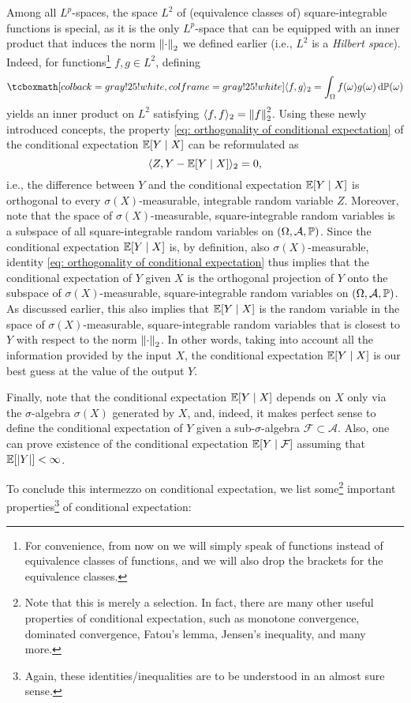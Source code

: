 Among all $L^p$-spaces, the space $L^2$ of (equivalence classes of) square-integrable functions is special, as it is the only $L^p$-space that can be equipped with an inner product that induces the norm $\norm{\cdot}_2$ we defined earlier (i.e., $L^2$ is a \emph{Hilbert space}). Indeed, for functions\footnote{For convenience, from now on we will simply speak of functions instead of equivalence classes of functions, and we will also drop the brackets for the equivalence classes.} $f, g \in L^2$, defining
\[
    \highlightMath{
        \langle f, g \rangle_2 = \int_{\Omega} f(\omega) g(\omega) \dP(\omega)
    }
\]
yields an inner product on $L^2$ satisfying $\langle f, f \rangle_2 = \norm{f}_2^2$. Using these newly introduced concepts, the property \eqref{eq: orthogonality of conditional expectation} of the conditional expectation $\Exp[Y \given X]$ can be reformulated as
\[
    \langle Z, Y - \Exp[Y \given X] \rangle_2 = 0,
\]
i.e., the difference between $Y$ and the conditional expectation $\Exp[Y \given X]$ is orthogonal to every $\sigma(X)$-measurable, integrable random variable $Z$. Moreover, note that the space of $\sigma(X)$-measurable, square-integrable random variables is a subspace of all square-integrable random variables on $(\Omega, \mathcal{A}, \P)$. Since the conditional expectation $\Exp[Y \given X]$ is, by definition, also $\sigma(X)$-measurable, identity \eqref{eq: orthogonality of conditional expectation} thus implies that the conditional expectation of $Y$ given $X$ is the orthogonal projection of $Y$ onto the subspace of $\sigma(X)$-measurable, square-integrable random variables on $(\Omega, \mathcal{A}, \P)$. As discussed earlier, this also implies that $\Exp[Y \given X]$ is the random variable in the space of $\sigma(X)$-measurable, square-integrable random variables that is closest to $Y$ with respect to the norm $\norm{\cdot}_2$. In other words, taking into account all the information provided by the input $X$, the conditional expectation $\Exp[Y \given X]$ is our best guess at the value of the output $Y$.

Finally, note that the conditional expectation $\Exp[Y \given X]$ depends on $X$ only via the $\sigma$-algebra $\sigma(X)$ generated by $X$, and, indeed, it makes perfect sense to define the conditional expectation of $Y$ given a sub-$\sigma$-algebra $\mathcal{F} \subset \mathcal{A}$. Also, one can prove existence of the conditional expectation $\Exp[Y \given \mathcal{F}]$ assuming that $\Exp[\abs{Y}] < \infty$.

To conclude this intermezzo on conditional expectation, we list some\footnote{Note that this is merely a selection. In fact, there are many other useful properties of conditional expectation, such as monotone convergence, dominated convergence, Fatou's lemma, Jensen's inequality, and many more.} important properties\footnote{Again, these identities/inequalities are to be understood in an almost sure sense.} of conditional expectation:

